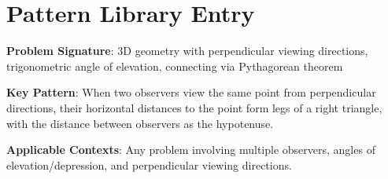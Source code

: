\documentclass[12pt]{article}
\begin{document}
\section*{Pattern Library Entry}
\textbf{Problem Signature}: 3D geometry with perpendicular viewing directions, trigonometric angle of elevation, connecting via Pythagorean theorem

\textbf{Key Pattern}: When two observers view the same point from perpendicular directions, their horizontal distances to the point form legs of a right triangle, with the distance between observers as the hypotenuse.

\textbf{Applicable Contexts}: Any problem involving multiple observers, angles of elevation/depression, and perpendicular viewing directions.
\end{document}
